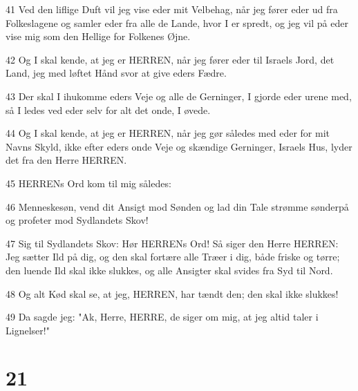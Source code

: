 \par 41 Ved den liflige Duft vil jeg vise eder mit Velbehag, når jeg fører eder ud fra Folkeslagene og samler eder fra alle de Lande, hvor I er spredt, og jeg vil på eder vise mig som den Hellige for Folkenes Øjne.
\par 42 Og I skal kende, at jeg er HERREN, når jeg fører eder til Israels Jord, det Land, jeg med løftet Hånd svor at give eders Fædre.
\par 43 Der skal I ihukomme eders Veje og alle de Gerninger, I gjorde eder urene med, så I ledes ved eder selv for alt det onde, I øvede.
\par 44 Og I skal kende, at jeg er HERREN, når jeg gør således med eder for mit Navns Skyld, ikke efter eders onde Veje og skændige Gerninger, Israels Hus, lyder det fra den Herre HERREN.
\par 45 HERRENs Ord kom til mig således:
\par 46 Menneskesøn, vend dit Ansigt mod Sønden og lad din Tale strømme sønderpå og profeter mod Sydlandets Skov!
\par 47 Sig til Sydlandets Skov: Hør HERRENs Ord! Så siger den Herre HERREN: Jeg sætter Ild på dig, og den skal fortære alle Træer i dig, både friske og tørre; den luende Ild skal ikke slukkes, og alle Ansigter skal svides fra Syd til Nord.
\par 48 Og alt Kød skal se, at jeg, HERREN, har tændt den; den skal ikke slukkes!
\par 49 Da sagde jeg: "Ak, Herre, HERRE, de siger om mig, at jeg altid taler i Lignelser!"

\chapter{21}

